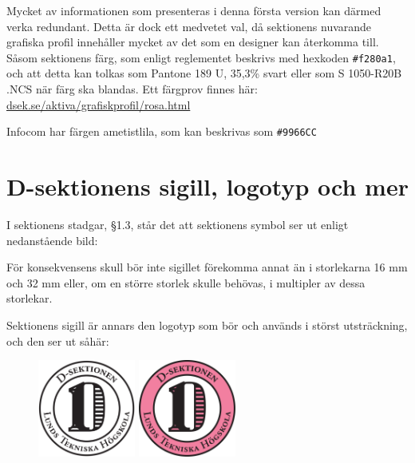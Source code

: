 \documentclass[]{dsekprotokoll}
\begin{document}
Mycket av informationen som presenteras i denna första version kan därmed verka redundant. Detta är dock ett medvetet val, då sektionens nuvarande grafiska profil innehåller mycket av det som en designer kan återkomma till. Såsom sektionens färg, som enligt reglementet beskrivs med hexkoden \texttt{\#f280a1}, och att detta kan tolkas som Pantone 189 U, 35,3\% svart eller som S 1050-R20B .NCS när färg ska blandas.
Ett färgprov finnes här: \\ \href{https://www.dsek.se/aktiva/grafiskprofil/rosa.html}{dsek.se/aktiva/grafiskprofil/rosa.html}

Infocom har färgen ametistlila, som kan beskrivas som \texttt{\#9966CC}



\section{D-sektionens sigill, logotyp och mer}
I sektionens stadgar, §1.3, står det att sektionens symbol ser ut enligt nedanstående bild:
\begin{figure} [!hbp]
    \centering
    \Dsymbol[32mm]
\end{figure}

För konsekvensens skull bör inte sigillet förekomma annat än i storlekarna 16 mm och 32 mm eller, om en större storlek skulle behövas, i multipler av dessa storlekar.

Sektionens sigill är annars den logotyp som bör och används i störst utsträckning, och den ser ut såhär:
\begin{figure}[!hbp]
    \centering
    \includegraphics[height=32mm]{D-logo-org-bw.pdf} \includegraphics[height=32mm]{D-logo-org-col.pdf}
    \label{fig:my_label}
\end{figure}
\end{document}
